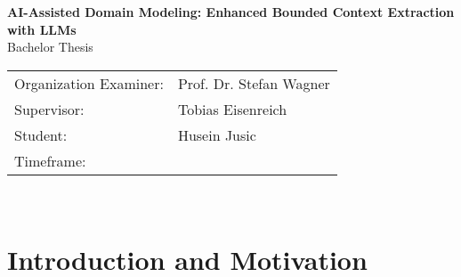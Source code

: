 \documentclass[12pt,a4paper]{article}
\begin{document}
\begin{center}
\large
\textbf{AI-Assisted Domain Modeling: Enhanced Bounded Context Extraction with LLMs}\\
\vspace{.5cm}
Bachelor Thesis\\
\vspace{.5cm}
\begin{tabular}{ll}
Organization Examiner: & Prof. Dr. Stefan Wagner \\
Supervisor: & Tobias Eisenreich \\
Student: & Husein Jusic \\
Timeframe: & 
\end{tabular}\\
\end{center}

\section{Introduction and Motivation}
\end{document}
